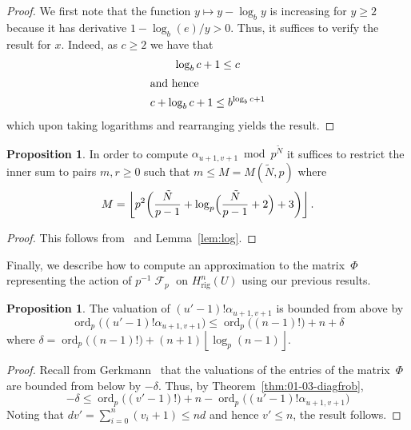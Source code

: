 \documentclass[a4paper,11pt]{article}
\numberwithin{equation}{section}
\providecommand{\floor}[1]{\left\lfloor#1\right\rfloor}   %
\DeclareMathOperator{\ord}{ord}          %
\DeclareMathOperator{\Frob}{\mathcal{F}} %
\providecommand{\Hrig}{H_{\text{rig}}}  %
\theoremstyle{definition}
\newtheorem{prop}[thm]{Proposition}
\begin{document}
\begin{proof}
We first note that the function $y \mapsto y - \log_b y$ is increasing 
for $y \geq 2$ because it has derivative $1 - \log_b(e)/y > 0$.  Thus, it 
suffices to verify the result for $x$.  Indeed, as $c \geq 2$ we have 
that 
\begin{gather}
\log_b c + 1 \leq c \\
\intertext{and hence}
c + \log_b c + 1 \leq b^{\log_b c + 1}
\end{gather}
which upon taking logarithms and rearranging yields the result.
\end{proof}

\begin{prop}
In order to compute $\alpha_{u+1,v+1} \bmod p^{\tilde{N}}$ it 
suffices to restrict the inner sum to pairs $m,r \geq 0$ such 
that $m \leq M = M(\tilde{N}, p)$ where 
\begin{equation}
M = \floor{ p^2 \biggl( \frac{\tilde{N}}{p-1} 
            + \log_p\Bigl(\frac{\tilde{N}}{p-1} + 2\Bigr) + 3 \biggr) }.
\end{equation}
\end{prop}

\begin{proof}
This follows from~\citep[\S 6.2]{Lauder2004b} and Lemma~\ref{lem:log}.
\end{proof}

Finally, we describe how to compute an approximation to the matrix~$\Phi$ 
representing the action of $p^{-1} \Frob_p$ on $\Hrig^{n}(U)$ using our 
previous results.

\begin{prop}
The valuation of $(u'-1)! \alpha_{u+1,v+1}$ is bounded from above by 
\begin{equation}
\ord_p\bigl((u'-1)! \alpha_{u+1,v+1}\bigr) 
    \leq \ord_p\bigl((n-1)!\bigr) + n + \delta
\end{equation}
where $\delta = \ord_p\bigl((n-1)!\bigr) + (n+1) \floor{\log_p(n-1)}$. 
\end{prop}

\begin{proof}
Recall from Gerkmann~\citep[Lemma~3.3]{Gerkmann2007} that the valuations 
of the entries of the matrix~$\Phi$ are bounded from below by $-\delta$. 
Thus, by Theorem~\ref{thm:01-03-diagfrob}, 
\begin{equation}
-\delta \leq \ord_p\bigl((v'-1)!\bigr) + n 
           - \ord_p\bigl((u'-1)! \alpha_{u+1,v+1}\bigr)
\end{equation}
Noting that $d v' = \sum_{i=0}^n (v_i + 1) \leq n d$ and 
hence $v' \leq n$, the result follows.
\end{proof}
\end{document}
